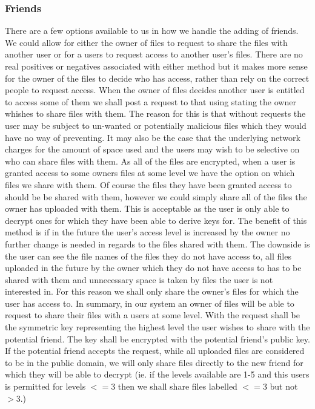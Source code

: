 \documentclass[12pt, titlepage]{article}
\begin{document}
\subsubsection{Friends}
There are a few options available to us in how we handle the adding of friends. We could allow for either the owner of files to request to share the files with another user or for a users to request access to another user's files. There are no real positives or negatives associated with either method but it makes more sense for the owner of the files to decide who has access, rather than rely on the correct people to request access.
\newline \indent When the owner of files decides another user is entitled to access some of them we shall post a request to that using stating the owner whishes to share files with them. The reason for this is that without requests the user may be subject to un-wanted or potentially malicious files which they would have no way of preventing. It may also be the case that the underlying network charges for the amount of space used and the users may wish to be selective on who can share files with them.
\newline \indent As all of the files are encrypted, when a user is granted access to some owners files at some level we have the option on which files we share with them. Of course the files they have been granted access to should be be shared with them, however we could simply share all of the files the owner has uploaded with them. This is acceptable as the user is only able to decrypt ones for which they have been able to derive keys for. The benefit of this method is if in the future the user's access level is increased by the owner no further change is needed in regards to the files shared with them. The downside is the user can see the file names of the files they do not have access to, all files uploaded in the future by the owner which they do not have access to has to be shared with them and unnecessary space is taken by files the user is not interested in. For this reason we shall only share the owner's files for which the user has access to.
In summary, in our system an owner of files will be able to request to share their files with a users at some level. With the request shall be the symmetric key representing the highest level the user wishes to share with the potential friend. The key shall be encrypted with the potential friend's public key. If the potential friend accepts the request, while all uploaded files are considered to be in the public domain, we will only share files directly to the new friend for which they will be able to decrypt (ie. if the levels available are 1-5 and this users is permitted for levels $<= 3$ then we shall share files labelled $<= 3$ but not $> 3$.)
\end{document}

